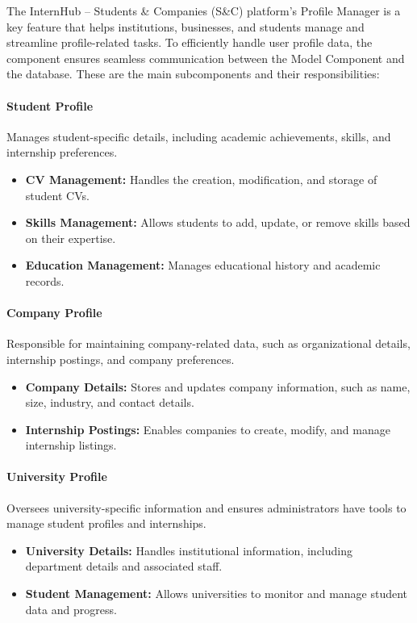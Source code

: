 The InternHub – Students \& Companies (S\&C) platform's Profile Manager is a key feature that helps institutions, businesses, and students manage and streamline profile-related tasks. To efficiently handle user profile data, the component ensures seamless communication between the Model Component and the database. These are the main subcomponents and their responsibilities:

\paragraph{Student Profile}
Manages student-specific details, including academic achievements, skills, and internship preferences.
\begin{itemize}
    \item \textbf{CV Management:} Handles the creation, modification, and storage of student CVs.
    \item \textbf{Skills Management:} Allows students to add, update, or remove skills based on their expertise.
    \item \textbf{Education Management:} Manages educational history and academic records.
\end{itemize}

\paragraph{Company Profile}
Responsible for maintaining company-related data, such as organizational details, internship postings, and company preferences.
\begin{itemize}
    \item \textbf{Company Details:} Stores and updates company information, such as name, size, industry, and contact details.
    \item \textbf{Internship Postings:} Enables companies to create, modify, and manage internship listings.
\end{itemize}

\paragraph{University Profile}
Oversees university-specific information and ensures administrators have tools to manage student profiles and internships.
\begin{itemize}
    \item \textbf{University Details:} Handles institutional information, including department details and associated staff.
    \item \textbf{Student Management:} Allows universities to monitor and manage student data and progress.
\end{itemize}

